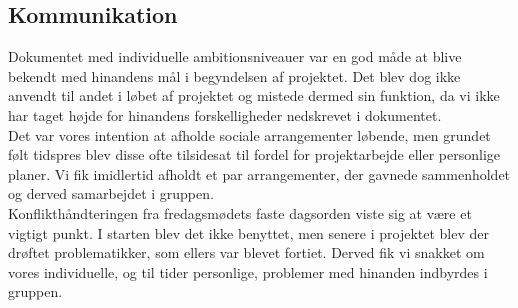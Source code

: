 \subsection{Kommunikation}
Dokumentet med individuelle ambitionsniveauer var en god måde at blive bekendt med hinandens mål i begyndelsen af projektet. Det blev dog ikke anvendt til andet i løbet af projektet og mistede dermed sin funktion, da vi ikke har taget højde for hinandens forskelligheder nedskrevet i dokumentet. \\
Det var vores intention at afholde sociale arrangementer løbende, men grundet følt tidspres blev disse ofte tilsidesat til fordel for projektarbejde eller personlige planer. Vi fik imidlertid afholdt et par arrangementer, der gavnede sammenholdet og derved samarbejdet i gruppen. \\
Konflikthåndteringen fra fredagsmødets faste dagsorden viste sig at være et vigtigt punkt. I starten blev det ikke benyttet, men senere i projektet blev der drøftet problematikker, som ellers var blevet fortiet. Derved fik vi snakket om vores individuelle, og til tider personlige, problemer med hinanden indbyrdes i gruppen.